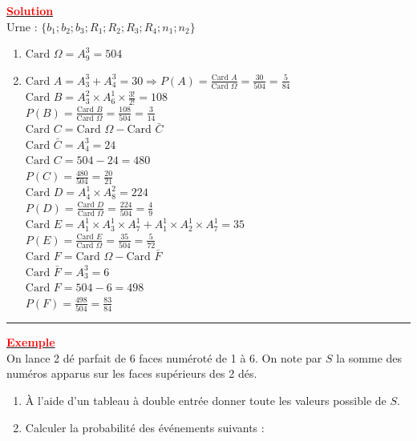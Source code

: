 \documentclass[12pt,a4paper]{article}
\begin{document}
\underline{\textbf{\textcolor{red}{Solution}}}\\
Urne : $\{b_1; b_2; b_3; R_1; R_2; R_3; R_4; n_1; n_2\}$
\begin{enumerate}
    \item $\text{Card } \Omega = A_9^3 = 504$
    \item 
    $\text{Card } A = A_3^3 + A_4^3 = 30 \Rightarrow P(A) = \frac{\text{Card } A}{\text{Card } \Omega} = \frac{30}{504} = \frac{5}{84}$ \\
    
    $\text{Card } B = A_3^2 \times A_6^1 \times \frac{3!}{2!} = 108$ \\
    $P(B) = \frac{\text{Card } B}{\text{Card } \Omega} = \frac{108}{504} = \frac{3}{14}$ \\
    
    $\text{Card } C = \text{Card } \Omega - \text{Card } \bar{C}$ \\
    $\text{Card } \bar{C} = A_4^3 = 24$ \\
    $\text{Card } C = 504 - 24 = 480$ \\
    $P(C) = \frac{480}{504} = \frac{20}{21}$ \\
    
    $\text{Card } D = A_4^1 \times A_8^2 = 224$ \\
    $P(D) = \frac{\text{Card } D}{\text{Card } \Omega} = \frac{224}{504} = \frac{4}{9}$ \\
    
    $\text{Card } E = A_1^1 \times A_3^1 \times A_7^1 + A_1^1 \times A_2^1 \times A_7^1 = 35$ \\
    $P(E) = \frac{\text{Card } E}{\text{Card } \Omega} = \frac{35}{504} = \frac{5}{72}$ \\
    
    $\text{Card } F = \text{Card } \Omega - \text{Card } \bar{F}$ \\
    $\text{Card } \bar{F} = A_3^3 = 6$ \\
    $\text{Card } F = 504 - 6 = 498$ \\
    $P(F) = \frac{498}{504} = \frac{83}{84}$
\end{enumerate}

\rule{\linewidth}{0.5pt}

\underline{\textbf{\textcolor{red}{Exemple}}}\\
On lance 2 dé parfait de 6 faces numéroté de 1 à 6. On note par $S$ la somme des numéros apparus sur les faces supérieurs des 2 dés.
\begin{enumerate}
    \item À l'aide d'un tableau à double entrée donner toute les valeurs possible de $S$.
    \item Calculer la probabilité des événements suivants :
\end{enumerate}
\end{document}
